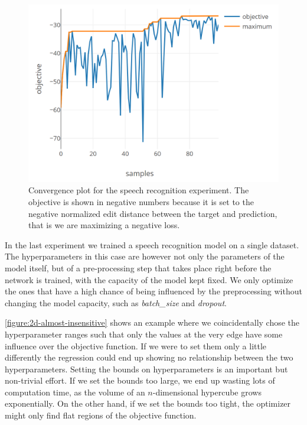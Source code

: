 \begin{figure}
	\begin{center}
		\includegraphics[width=1.0\textwidth]{images/speech-convergence.png}
		\caption{Convergence plot for the speech recognition experiment. The objective is shown in negative numbers because it is set to the negative normalized edit distance between the target and prediction, that is we are maximizing a negative loss.}
		\label{figure:speech-convergence}
	\end{center}
\end{figure}

In the last experiment we trained a speech recognition model on a single dataset. The hyperparameters in this case are however not only the parameters of the model itself, but of a pre-processing step that takes place right before the network is trained, with the capacity of the model kept fixed. We only optimize the ones that have a high chance of being influenced by the preprocessing without changing the model capacity, such as \emph{batch\_size} and \emph{dropout}.

\autoref{figure:2d-almost-insensitive} shows an example where we coincidentally chose the hyperparameter ranges such that only the values at the very edge have some influence over the objective function. If we were to set them only a little differently the regression could end up showing no relationship between the two hyperparameters. Setting the bounds on hyperparameters is an important but non-trivial effort. If we set the bounds too large, we end up wasting lots of computation time, as the volume of an $n$-dimensional hypercube grows exponentially. On the other hand, if we set the bounds too tight, the optimizer might only find flat regions of the objective function.

